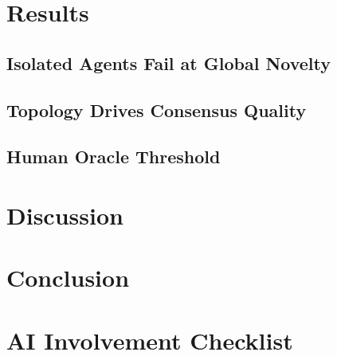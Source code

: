 \documentclass[11pt]{article}
\begin{document}
\section{Results}
\label{sec:results}


\subsection{Isolated Agents Fail at Global Novelty}

\subsection{Topology Drives Consensus Quality}

\subsection{Human Oracle Threshold}

\section{Discussion}
\label{sec:discussion}


\section{Conclusion}
\label{sec:conclusion}




\newpage
\section*{AI Involvement Checklist}
\end{document}
